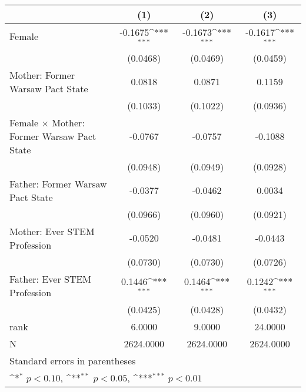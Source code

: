 {
\def\sym#1{\ifmmode^{#1}\else\(^{#1}\)\fi}
\begin{tabular}{l*{3}{c}}
\toprule
                    &\multicolumn{1}{c}{(1)}         &\multicolumn{1}{c}{(2)}         &\multicolumn{1}{c}{(3)}         \\
\midrule
Female              &     -0.1675\sym{***}&     -0.1673\sym{***}&     -0.1617\sym{***}\\
                    &    (0.0468)         &    (0.0469)         &    (0.0459)         \\
\addlinespace
Mother: Former Warsaw Pact State&      0.0818         &      0.0871         &      0.1159         \\
                    &    (0.1033)         &    (0.1022)         &    (0.0936)         \\
\addlinespace
Female $\times$ Mother: Former Warsaw Pact State&     -0.0767         &     -0.0757         &     -0.1088         \\
                    &    (0.0948)         &    (0.0949)         &    (0.0928)         \\
\addlinespace
Father: Former Warsaw Pact State&     -0.0377         &     -0.0462         &      0.0034         \\
                    &    (0.0966)         &    (0.0960)         &    (0.0921)         \\
\addlinespace
Mother: Ever STEM Profession&     -0.0520         &     -0.0481         &     -0.0443         \\
                    &    (0.0730)         &    (0.0730)         &    (0.0726)         \\
\addlinespace
Father: Ever STEM Profession&      0.1446\sym{***}&      0.1464\sym{***}&      0.1242\sym{***}\\
                    &    (0.0425)         &    (0.0428)         &    (0.0432)         \\
\midrule
rank                &      6.0000         &      9.0000         &     24.0000         \\
N                   &   2624.0000         &   2624.0000         &   2624.0000         \\
\bottomrule
\multicolumn{4}{l}{\footnotesize Standard errors in parentheses}\\
\multicolumn{4}{l}{\footnotesize \sym{*} \(p<0.10\), \sym{**} \(p<0.05\), \sym{***} \(p<0.01\)}\\
\end{tabular}
}

